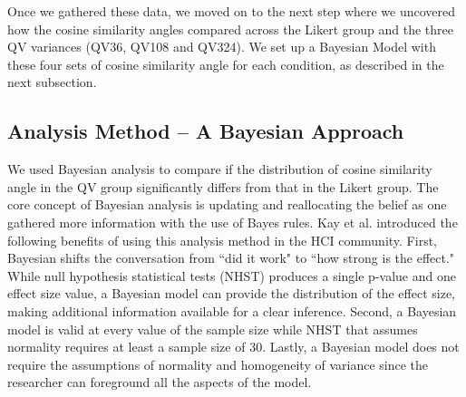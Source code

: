 Once we gathered these data, we moved on to the next step where we uncovered how the cosine similarity angles compared across the Likert group and the three QV variances (QV36, QV108 and QV324). We set up a Bayesian Model with these four sets of cosine similarity angle for each condition, as described in the next subsection.

\subsection{Analysis Method -- A Bayesian Approach}
\label{exp1:The Bayesian Model}



We used Bayesian analysis to compare if the distribution of cosine similarity angle in the QV group significantly differs from that in the Likert group. The core concept of Bayesian analysis is updating and reallocating the belief as one gathered more information with the use of Bayes rules. Kay et al. \cite{kay2016researcher} introduced the following benefits of using this analysis method in the HCI community. First, Bayesian shifts the conversation from ``did it work" to ``how strong is the effect." While null hypothesis statistical tests (NHST) produces a single p-value and one effect size value, a Bayesian model can provide the distribution of the effect size, making additional information available for a clear inference. Second, a Bayesian model is valid at every value of the sample size while NHST that assumes normality requires at least a sample size of 30. Lastly, a Bayesian model does not require the assumptions of normality and homogeneity of variance since the researcher can foreground all the aspects of the model. 


